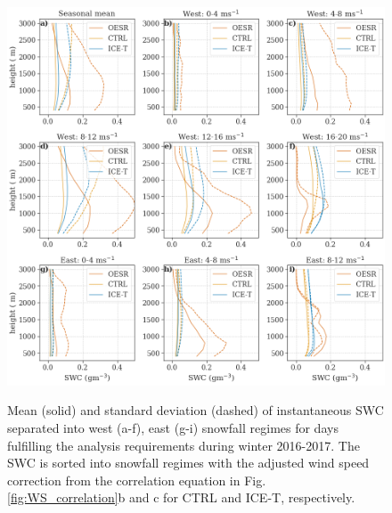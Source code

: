 \documentclass{ametsocV5}
\providecommand{\DIFaddbeginFL}{} %
\providecommand{\DIFaddendFL}{} %
\providecommand{\DIFdelbeginFL}{} %
\providecommand{\DIFdelendFL}{} %
\newcommand{\DIFscaledelfig}{0.5}
\newlength{\DIFdelgraphicswidth} %
\newlength{\DIFdelgraphicsheight} %
\newcommand{\DIFaddincludegraphics}[2][]{{\color{blue}\fbox{\DIFOincludegraphics[#1]{#2}}}} %
\newcommand{\DIFdelincludegraphics}[2][]{%
\sbox{\DIFdelgraphicsbox}{\DIFOincludegraphics[#1]{#2}}%
\settoboxwidth{\DIFdelgraphicswidth}{\DIFdelgraphicsbox} %
\settoboxtotalheight{\DIFdelgraphicsheight}{\DIFdelgraphicsbox} %
\scalebox{\DIFscaledelfig}{%
\parbox[b]{\DIFdelgraphicswidth}{\usebox{\DIFdelgraphicsbox}\\[-\baselineskip] \rule{\DIFdelgraphicswidth}{0em}}\llap{\resizebox{\DIFdelgraphicswidth}{\DIFdelgraphicsheight}{%
\setlength{\unitlength}{\DIFdelgraphicswidth}%
\begin{picture}(1,1)%
\thicklines\linethickness{2pt} %
{\color[rgb]{1,0,0}\put(0,0){\framebox(1,1){}}}%
{\color[rgb]{1,0,0}\put(0,0){\line( 1,1){1}}}%
{\color[rgb]{1,0,0}\put(0,1){\line(1,-1){1}}}%
\end{picture}%
}\hspace*{3pt}}} %
} %
\DeclareRobustCommand{\DIFaddbeginFL}{\DIFOaddbeginFL \let\includegraphics\DIFaddincludegraphics} %
\DeclareRobustCommand{\DIFaddendFL}{\DIFOaddendFL \let\includegraphics\DIFOincludegraphics} %
\DeclareRobustCommand{\DIFdelbeginFL}{\DIFOdelbeginFL \let\includegraphics\DIFdelincludegraphics} %
\DeclareRobustCommand{\DIFdelendFL}{\DIFOaddendFL \let\includegraphics\DIFOincludegraphics} %
\begin{document}
\begin{figure}
	\noindent\DIFdelbeginFL %
\DIFdelendFL \DIFaddbeginFL \includegraphics[width=\textwidth,angle=0]{fig9.png}\DIFaddendFL \\
	\caption{Mean (solid) and standard deviation (dashed) of instantaneous SWC separated into west (a-f), east (g-i) snowfall regimes for days fulfilling the analysis requirements during winter 2016-2017. The SWC is sorted into snowfall regimes with the adjusted wind speed correction from the correlation equation in Fig. \ref{fig:WS_correlation}b and c for CTRL and ICE-T, respectively.
	}
	\label{fig:vert_swc}
\end{figure}
\end{document}
